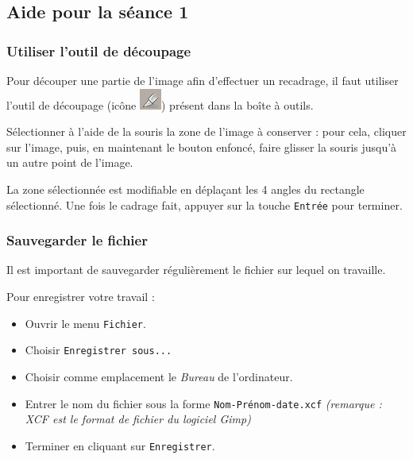 \subsection{Aide pour la séance 1}


\subsubsection{Utiliser l'outil de découpage}\label{correction_gimp01}

Pour découper une partie de l'image afin d'effectuer un recadrage, il faut utiliser l'outil de découpage (icône \includegraphics[width=.04\textwidth]{./images/gimp/cutter}) présent dans la boîte à outils.

Sélectionner à l'aide de la souris la zone de l'image à conserver : pour cela, cliquer sur l'image, puis, en maintenant le bouton enfoncé, faire glisser la souris jusqu'à un autre point de l'image. 


La zone sélectionnée est modifiable en déplaçant les 4 angles du rectangle sélectionné. Une fois le cadrage fait, appuyer sur la touche \texttt{Entrée} pour terminer.


\subsubsection{Sauvegarder le fichier}

Il est important de sauvegarder régulièrement le fichier sur lequel on travaille.

Pour enregistrer votre travail :
\begin{itemize}
\item Ouvrir le menu \texttt{Fichier}.
\item Choisir \texttt{Enregistrer sous...}
\item Choisir comme emplacement le \emph{Bureau} de l'ordinateur.
\item Entrer le nom du fichier sous la forme \texttt{Nom-Prénom-date.xcf} \emph{(remarque : XCF est le format de fichier du logiciel Gimp)} 
\item Terminer en cliquant sur \texttt{Enregistrer}.   
\end{itemize}


